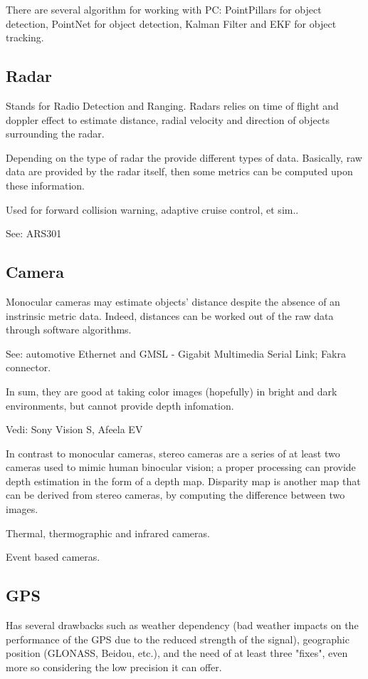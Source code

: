There are several algorithm for working with PC: PointPillars for object detection, PointNet for object detection, Kalman Filter and EKF for object tracking.

\subsection{Radar}
Stands for Radio Detection and Ranging.
Radars relies on time of flight and doppler effect to estimate distance, radial velocity and direction of objects surrounding the radar.

Depending on the type of radar the provide different types of data. Basically, raw data are provided by the radar itself, then some metrics can be computed upon these information.

Used for forward collision warning, adaptive cruise control, et sim..

See: ARS301

\subsection{Camera}
Monocular cameras may estimate objects' distance despite the absence of an instrinsic metric data. Indeed, distances can be worked out of the raw data through software algorithms.

See: automotive Ethernet and GMSL - Gigabit Multimedia Serial Link; Fakra connector.

In sum, they are good at taking color images (hopefully) in bright and dark environments, but cannot provide depth infomation.

Vedi: Sony Vision S, Afeela EV

In contrast to monocular cameras, stereo cameras are a series of at least two cameras used to mimic human binocular vision; a proper processing can provide depth estimation in the form of a depth map.
Disparity map is another map that can be derived from stereo cameras, by computing the difference between two images.

Thermal, thermographic and infrared cameras.

Event based cameras.

\subsection{GPS}
Has several drawbacks such as weather dependency (bad weather impacts on the performance of the GPS due to the reduced strength of the signal), geographic position (GLONASS, Beidou, etc.), and the need of at least three "fixes", even more so considering the low precision it can offer.

